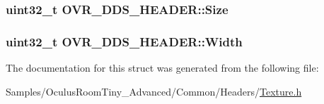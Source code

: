\subsubsection[{\texorpdfstring{Size}{Size}}]{\setlength{\rightskip}{0pt plus 5cm}uint32\+\_\+t O\+V\+R\+\_\+\+D\+D\+S\+\_\+\+H\+E\+A\+D\+E\+R\+::\+Size}\hypertarget{struct_o_v_r___d_d_s___h_e_a_d_e_r_a8c1fe9cdf1df7ef768513ea787cc69df}{}\label{struct_o_v_r___d_d_s___h_e_a_d_e_r_a8c1fe9cdf1df7ef768513ea787cc69df}
\subsubsection[{\texorpdfstring{Width}{Width}}]{\setlength{\rightskip}{0pt plus 5cm}uint32\+\_\+t O\+V\+R\+\_\+\+D\+D\+S\+\_\+\+H\+E\+A\+D\+E\+R\+::\+Width}\hypertarget{struct_o_v_r___d_d_s___h_e_a_d_e_r_af4fdcef5698afebef9d5ad1270955e83}{}\label{struct_o_v_r___d_d_s___h_e_a_d_e_r_af4fdcef5698afebef9d5ad1270955e83}


The documentation for this struct was generated from the following file\+:\begin{DoxyCompactItemize}
\item 
Samples/\+Oculus\+Room\+Tiny\+\_\+\+Advanced/\+Common/\+Headers/\hyperlink{_texture_8h}{Texture.\+h}\end{DoxyCompactItemize}
